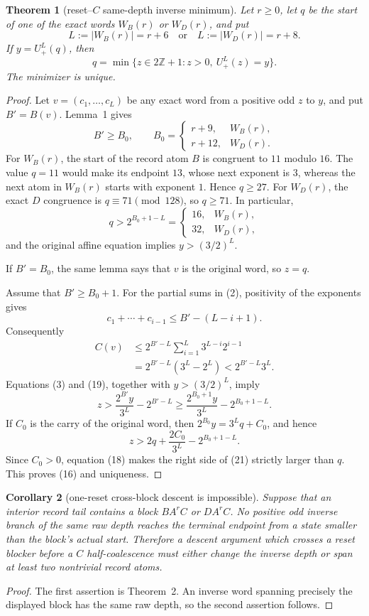 \documentclass[11pt]{article}
\newtheorem{theorem}{Theorem}
\newtheorem{corollary}[theorem]{Corollary}
\newcommand{\Up}{U_+}
\begin{document}
\begin{theorem}[reset--$C$ same-depth inverse minimum]
Let $r\geq0$, let $q$ be the start of one of the exact words
$W_B(r)$ or $W_D(r)$, and put
\[
 L:=|W_B(r)|=r+6
 \quad\text{or}\quad
 L:=|W_D(r)|=r+8.
 \tag{15}
\]
If $y=\Up^L(q)$, then
\[
 \boxed{
 q=\min\{z\in2\mathbb Z+1:z>0,\ \Up^L(z)=y\}.}
 \tag{16}
\]
The minimizer is unique.
\end{theorem}

\begin{proof}
Let $v=(c_1,\ldots,c_L)$ be any exact word from a positive odd $z$ to
$y$, and put $B'=B(v)$.  Lemma~1 gives
\[
 B'\geq B_0,
 \qquad
 B_0=
 \begin{cases}
  r+9,&W_B(r),\\
  r+12,&W_D(r).
 \end{cases}
 \tag{17}
\]
For $W_B(r)$, the start of the record atom $B$ is congruent to $11$
modulo $16$.  The value $q=11$ would make its endpoint $13$, whose next
exponent is $3$, whereas the next atom in $W_B(r)$ starts with exponent
$1$.  Hence $q\geq27$.  For $W_D(r)$, the exact $D$ congruence is
$q\equiv71\pmod {128}$, so $q\geq71$.  In particular,
\[
 q>2^{B_0+1-L}
 =\begin{cases}16,&W_B(r),\\32,&W_D(r),\end{cases}
 \tag{18}
\]
and the original affine equation implies $y>(3/2)^L$.

If $B'=B_0$, the same lemma says that $v$ is the original word, so
$z=q$.

Assume that $B'\geq B_0+1$.  For the partial sums in (2), positivity of
the exponents gives
\[
 c_1+\cdots+c_{i-1}\leq B'-(L-i+1).
\]
Consequently
\[
\begin{aligned}
 C(v)
 &\leq2^{B'-L}
       \sum_{i=1}^L3^{L-i}2^{i-1}\\
 &=2^{B'-L}(3^L-2^L)
 <2^{B'-L}3^L.
\end{aligned}
\tag{19}
\]
Equations (3) and (19), together with $y>(3/2)^L$, imply
\[
 z>
 \frac{2^{B'}y}{3^L}-2^{B'-L}
 \geq
 \frac{2^{B_0+1}y}{3^L}-2^{B_0+1-L}.
 \tag{20}
\]
If $C_0$ is the carry of the original word, then
$2^{B_0}y=3^Lq+C_0$, and hence
\[
 z>2q+\frac{2C_0}{3^L}-2^{B_0+1-L}.
 \tag{21}
\]
Since $C_0>0$, equation (18) makes the right side of (21) strictly larger
than $q$.  This proves (16) and uniqueness.
\end{proof}

\begin{corollary}[one-reset cross-block descent is impossible]
Suppose that an interior record tail contains a block $BA^rC$ or
$DA^rC$.  No positive odd inverse branch of the same raw depth reaches
the terminal endpoint from a state smaller than the block's actual start.
Therefore a descent argument which crosses a reset blocker before a
$C$ half-coalescence must either change the inverse depth or span at least
two nontrivial record atoms.
\end{corollary}

\begin{proof}
The first assertion is Theorem~2.  An inverse word spanning precisely the
displayed block has the same raw depth, so the second assertion follows.
\end{proof}
\end{document}
